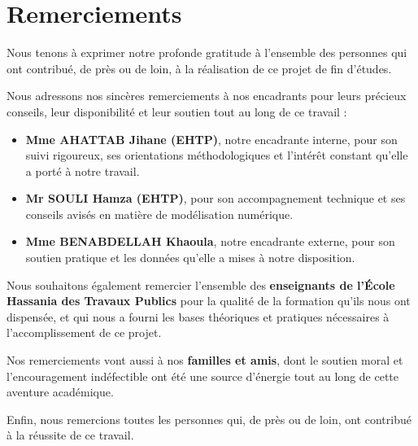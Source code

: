 \chapter*{Remerciements}
\thispagestyle{plain}

\vspace*{0.5cm}

Nous tenons à exprimer notre profonde gratitude à l'ensemble des personnes qui ont contribué, de près ou de loin, à la réalisation de ce projet de fin d'études.

\vspace{0.6cm}

Nous adressons nos sincères remerciements à nos encadrants pour leurs précieux conseils, leur disponibilité et leur soutien tout au long de ce travail :

\begin{itemize}
    \item \textbf{Mme AHATTAB Jihane (EHTP)}, notre encadrante interne, pour son suivi rigoureux, ses orientations méthodologiques et l'intérêt constant qu'elle a porté à notre travail.
    \item \textbf{Mr SOULI Hamza (EHTP)}, pour son accompagnement technique et ses conseils avisés en matière de modélisation numérique.
    \item \textbf{Mme BENABDELLAH Khaoula}, notre encadrante externe, pour son soutien pratique et les données qu'elle a mises à notre disposition.
\end{itemize}

\vspace{0.6cm}

Nous souhaitons également remercier l'ensemble des \textbf{enseignants de l'École Hassania des Travaux Publics} pour la qualité de la formation qu'ils nous ont dispensée, et qui nous a fourni les bases théoriques et pratiques nécessaires à l'accomplissement de ce projet.

\vspace{0.6cm}

Nos remerciements vont aussi à nos \textbf{familles et amis}, dont le soutien moral et l'encouragement indéfectible ont été une source d'énergie tout au long de cette aventure académique.

\vspace{0.6cm}

Enfin, nous remercions toutes les personnes qui, de près ou de loin, ont contribué à la réussite de ce travail.

\newpage
